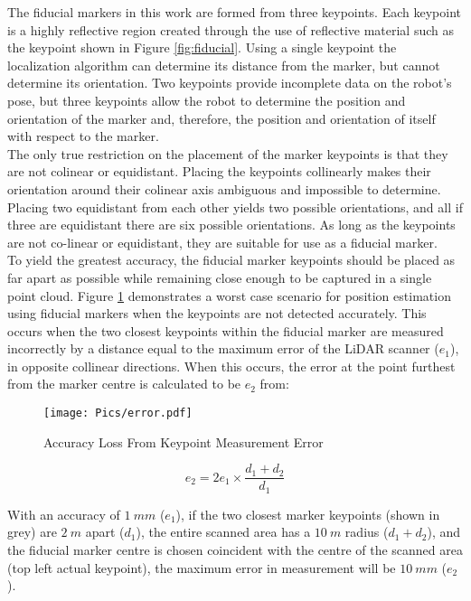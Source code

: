The fiducial markers in this work are formed from three keypoints. Each keypoint is a highly reflective region created through the use of reflective material such as the keypoint shown in Figure \ref{fig:fiducial}. Using a single keypoint the localization algorithm can determine its distance from the marker, but cannot determine its orientation. Two keypoints provide incomplete data on the robot's pose, but three keypoints allow the robot to determine the position and orientation of the marker and, therefore, the position and orientation of itself with respect to the marker.\\

The only true restriction on the placement of the marker keypoints is that they are not colinear or equidistant. Placing the keypoints collinearly makes their orientation around their colinear axis ambiguous and impossible to determine. Placing two equidistant from each other yields two possible orientations, and all if three are equidistant there are six possible orientations. As long as the keypoints are not co-linear or equidistant, they are suitable for use as a fiducial marker.\\

To yield the greatest accuracy, the fiducial marker keypoints should be placed as far apart as possible while remaining close enough to be captured in a single point cloud. Figure \ref{fig:resacc} demonstrates a worst case scenario for position estimation using fiducial markers when the keypoints are not detected accurately. This occurs when the two closest keypoints within the fiducial marker are measured incorrectly by a distance equal to the maximum error of the LiDAR scanner ($e_1$), in opposite collinear directions. When this occurs, the error at the point furthest from the marker centre is calculated to be $e_2$ from:

\begin{figure}
\texttt{[image: Pics/error.pdf]}
\caption{Accuracy Loss From Keypoint Measurement Error}
\label{fig:resacc} 
\end{figure}

\begin{equation}
   e_2 = 2e_1\times\frac{d_1+d_2}{d_1}\label{eq:2}
\end{equation}

With an accuracy of $1\ mm$ ($e_1$), if the two closest marker keypoints (shown in grey) are $2\ m$ apart ($d_1$), the entire scanned area has a $10\ m$ radius ($d_1+d_2$), and the fiducial marker centre is chosen coincident with the centre of the scanned area (top left actual keypoint), the maximum error in measurement will be $10\ mm$ ($e_2$).\\

